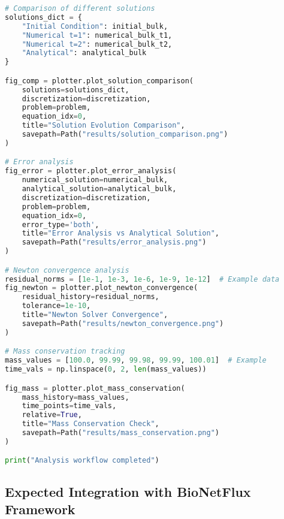 \begin{lstlisting}[language=Python, caption=Expected Analysis Workflow]
# Comparison of different solutions
solutions_dict = {
    "Initial Condition": initial_bulk,
    "Numerical t=1": numerical_bulk_t1,
    "Numerical t=2": numerical_bulk_t2,
    "Analytical": analytical_bulk
}

fig_comp = plotter.plot_solution_comparison(
    solutions=solutions_dict,
    discretization=discretization,
    problem=problem,
    equation_idx=0,
    title="Solution Evolution Comparison",
    savepath=Path("results/solution_comparison.png")
)

# Error analysis
fig_error = plotter.plot_error_analysis(
    numerical_solution=numerical_bulk,
    analytical_solution=analytical_bulk,
    discretization=discretization,
    problem=problem,
    equation_idx=0,
    error_type='both',
    title="Error Analysis vs Analytical Solution",
    savepath=Path("results/error_analysis.png")
)

# Newton convergence analysis
residual_norms = [1e-1, 1e-3, 1e-6, 1e-9, 1e-12]  # Example data
fig_newton = plotter.plot_newton_convergence(
    residual_history=residual_norms,
    tolerance=1e-10,
    title="Newton Solver Convergence",
    savepath=Path("results/newton_convergence.png")
)

# Mass conservation tracking
mass_values = [100.0, 99.99, 99.98, 99.99, 100.01]  # Example
time_vals = np.linspace(0, 2, len(mass_values))

fig_mass = plotter.plot_mass_conservation(
    mass_history=mass_values,
    time_points=time_vals,
    relative=True,
    title="Mass Conservation Check",
    savepath=Path("results/mass_conservation.png")
)

print("Analysis workflow completed")
\end{lstlisting}

\subsection{Expected Integration with BioNetFlux Framework}

